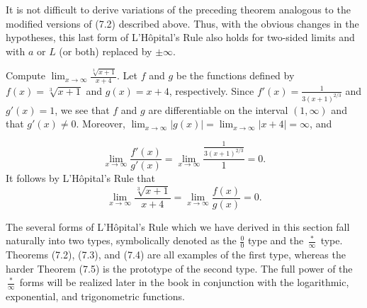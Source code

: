 It is not difficult to derive variations of the preceding theorem analogous to the modified versions of (7.2) described above. Thus, with the obvious changes in the hypotheses, this last form of L'H\^{o}pital's Rule also holds for two-sided limits and with $a$ or $L$ (or both) replaced by $\pm \infty$.

\begin{example}
Compute $\lim_{x \rightarrow \infty} \frac{\sqrt[3]{x + 1}}{x + 4} $. Let $f$ and $g$ be the functions  defined by $f(x) = \sqrt[3]{x + 1}$ and $g(x) = x + 4$, respectively. Since $f'(x) = \frac{1}{3(x + 1)^{2/3}}$ and $g'(x) = 1$, we see that $f$ and $g$ are differentiable on the interval $(1, \infty)$ and that $g'(x) \neq 0$. Moreover, $\lim_{x \rightarrow \infty} |g(x)| = \lim_{x \rightarrow \infty} |x + 4| = \infty$, and

$$
\lim_{x \rightarrow \infty} \frac{f'(x)}{g'(x)} = \lim_{x \rightarrow \infty} \frac{\frac{1}{3(x + 1)^{2/3}}}{1} = 0. 
$$
It follows by L'H\^{o}pital's Rule that 
$$
\lim_{x \rightarrow \infty}\frac{\sqrt[3]{x + 1}}{x + 4} = \lim_{x \rightarrow
\infty}\frac{f(x)}{g(x)} = 0.
$$

The several forms of L'H\^{o}pital's Rule which we have derived in this section fall naturally into two types, symbolically denoted as the $\frac{0}{0}$ type and the $\frac{*}{\infty}$ type. Theorems (7.2), (7.3), and (7.4) are all examples of the first type, whereas the harder Theorem (7.5) is the prototype of the second type. The full power of the $\frac{*}{\infty}$ forms will be realized later in the book in conjunction with the logarithmic, exponential, and trigonometric functions.
\end{example}

